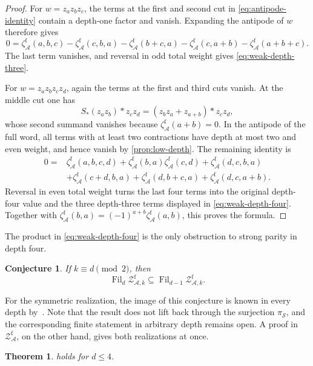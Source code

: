 \documentclass[12pt]{amsart}
\numberwithin{equation}{section}
\theoremstyle{plain}
\newtheorem{thm}{Theorem}[section]
\newtheorem{conj}[conj]{Conjecture}
\DeclareMathOperator{\Fil}{Fil}
\newcommand{\ZAf}{{\mathcal Z_{\mathcal A}^{\mathrm f}}}
\newcommand{\ZAfw}[1]{{\mathcal Z_{\mathcal A,#1}^{\mathrm f}}}
\newcommand{\zaf}[1]{\zeta_{\mathcal A}^{\mathrm f}(#1)}
\begin{document}
\begin{proof}
For $w=z_az_bz_c$, the terms at the first and second cut in
\eqref{eq:antipode-identity} contain a depth-one factor and vanish.
Expanding the antipode of $w$ therefore gives
\[
 0=\zaf{a,b,c}-\zaf{c,b,a}-\zaf{b+c,a}
   -\zaf{c,a+b}-\zaf{a+b+c}.
\]
The last term vanishes, and reversal in odd total weight gives
\eqref{eq:weak-depth-three}.

For $w=z_az_bz_cz_d$, again the terms at the first and third cuts
vanish. At the middle cut one has
\[
 S_*(z_az_b)*z_cz_d=(z_bz_a+z_{a+b})*z_cz_d,
\]
whose second summand vanishes because $\zaf{a+b}=0$. In the antipode
of the full word, all terms with at least two contractions have depth at
most two and even weight, and hence vanish by \cref{prop:low-depth}.
The remaining identity is
\[\begin{aligned}
0={}&\zaf{a,b,c,d}+\zaf{b,a}\zaf{c,d}+\zaf{d,c,b,a}\\
 &+\zaf{c+d,b,a}+\zaf{d,b+c,a}+\zaf{d,c,a+b}.
\end{aligned}\]
Reversal in even total weight turns the last four terms into the original
depth-four value and the three depth-three terms displayed in
\eqref{eq:weak-depth-four}. Together with
$\zaf{b,a}=(-1)^{a+b}\zaf{a,b}$, this proves the formula.
\end{proof}



The product in \eqref{eq:weak-depth-four} is the only obstruction to strong parity in depth four.

\begin{conj}\label{conj:strong-parity}
If $k\equiv d\pmod2$, then
\[
 \Fil_d\ZAfw{k}\subseteq\Fil_{d-1}\ZAfw{k}.
\]
\end{conj}

For the symmetric realization, the image of this conjecture is known in
every depth by~\cite[Corollary to Theorem~4]{KZ}. Note that the result does not lift
back through the surjection $\pi_{\mathcal S}$, and the corresponding
finite statement in arbitrary depth remains open. A proof in $\ZAf$, on the other hand,
gives both realizations at once.

\begin{thm}
\label{thm:strong-parity-four}
 holds for $d\leq4$.
\end{thm}
\end{document}
